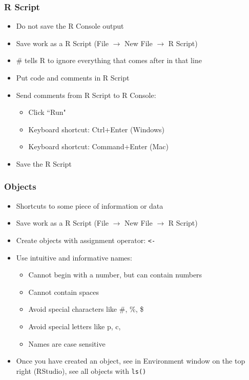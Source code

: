 \documentclass{beamer}
\begin{document}
\begin{frame}
 \frametitle<+->{R Script}
 \begin{itemize}
   \item Do not save the R Console output
   \item Save work as a R Script (File $\rightarrow$ New File $\rightarrow$ R Script)
   \item \# tells R to ignore everything that comes after in that line
   \item Put code and comments in R Script
   \item Send comments from R Script to R Console:
     \begin{itemize}
       \item Click ``Run"
       \item Keyboard shortcut: Ctrl+Enter (Windows)
       \item Keyboard shortcut: Command+Enter (Mac)
     \end{itemize}
   \item Save the R Script
 \end{itemize}
\end{frame}

\begin{frame}
 \frametitle<+->{Objects}
 \begin{itemize}
   \item Shortcuts to some piece of information or data
   \item Save work as a R Script (File $\rightarrow$ New File $\rightarrow$ R Script)
   \item Create objects with assignment operator: {\tt <-}
   \item Use intuitive and informative names:
     \begin{itemize}
       \item Cannot begin with a number, but can contain numbers
       \item Cannot contain spaces
       \item Avoid special characters like \#, \%, \$
       \item Avoid special letters like p, c, 
       \item Names are case sensitive
     \end{itemize}
   \item Once you have created an object, see in Environment window on the top right (RStudio), see all objects with {\tt ls()}
 \end{itemize}
\end{frame}
\end{document}
